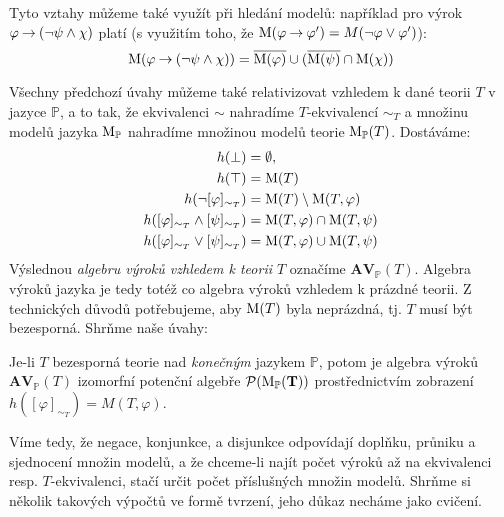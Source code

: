 \begin{remark}
Tyto vztahy můžeme také využít při hledání modelů: například pro výrok $\varphi\mathbin{\rightarrow}(\neg\psi\land\chi)$ platí (s využitím toho, že $\operatorname{M}(\varphi\mathbin{\rightarrow}\varphi')=M(\neg\varphi\lor\varphi')$):
$$
\operatorname{M}(\varphi\mathbin{\rightarrow}(\neg\psi\land\chi))=\overline{\operatorname{M}(\varphi)}\cup(\overline{\operatorname{M}(\psi)}\cap\operatorname{M}(\chi))
$$
\end{remark}

Všechny předchozí úvahy můžeme také relativizovat vzhledem k dané teorii $T$ v jazyce $\mathbb P$, a to tak, že ekvivalenci $\sim$ nahradíme $T$-ekvivalencí $\sim_T$ a množinu modelů jazyka $\operatorname{M}_\mathbb P$ nahradíme množinou modelů teorie $\operatorname{M}_\mathbb P(T)$. Dostáváme:
\begin{align*}
    h(\bot)&=\emptyset,\\
    h(\top)&=\operatorname{M}(T)\\
    h(\neg[\varphi]_{\sim_T})&=\operatorname{M}(T)\setminus\operatorname{M}(T,\varphi)\\
    h([\varphi]_{\sim_T}\land[\psi]_{\sim_T})&=\operatorname{M}(T,\varphi)\cap\operatorname{M}(T,\psi)\\
    h([\varphi]_{\sim_T}\lor[\psi]_{\sim_T})&=\operatorname{M}(T,\varphi)\cup\operatorname{M}(T,\psi)
\end{align*}
Výslednou \emph{algebru výroků vzhledem k teorii $T$} označíme $\mathbf{AV}_\mathbb P(T)$. Algebra výroků jazyka je tedy totéž co algebra výroků vzhledem k prázdné teorii. Z technických důvodů potřebujeme, aby $\operatorname{M}(T)$ byla neprázdná, tj. $T$ musí být bezesporná. Shrňme naše úvahy:

\begin{corollary}\label{corollary:lt-algebra}
Je-li $T$ bezesporná teorie nad \emph{konečným} jazykem $\mathbb P$, potom je algebra výroků   $\mathbf{AV}_\mathbb P(T)$ izomorfní potenční algebře $\mathbf{\mathcal P(\operatorname{M}_\mathbb P(T))}$ prostřednictvím zobrazení $h([\varphi]_{\sim_T})=M(T,\varphi)$.
\end{corollary}

Víme tedy, že negace, konjunkce, a disjunkce odpovídají doplňku, průniku a sjednocení množin modelů, a že chceme-li najít počet výroků až na ekvivalenci resp. $T$-ekvivalenci, stačí určit počet příslušných množin modelů. Shrňme si několik takových výpočtů ve formě tvrzení, jeho důkaz necháme jako cvičení.

